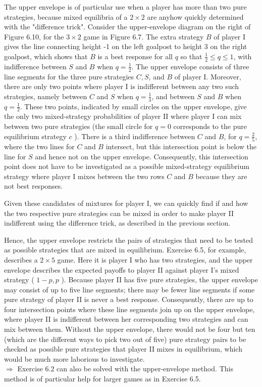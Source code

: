 \documentclass[12pt]{article}
\begin{document}
The upper envelope is of particular use when a player has more than two pure strategies, because mixed equilibria of a $2 \times 2$ are anyhow quickly determined with the "difference trick". Consider the upper-envelope diagram on the right of Figure 6.10, for the $3 \times 2$ game in Figure 6.7. The extra strategy $B$ of player I gives the line connecting height -1 on the left goalpost to height 3 on the right goalpost, which shows that $B$ is a best response for all $q$ so that $\frac{1}{2} \leq q \leq 1$, with indifference between $S$ and $B$ when $q=\frac{1}{2}$. The upper envelope consists of three line segments for the three pure strategies $C, S$, and $B$ of player I. Moreover, there are only two points where player I is indifferent between any two such strategies, namely between $C$ and $S$ when $q=\frac{1}{3}$, and between $S$ and $B$ when $q=\frac{1}{2}$. These two points, indicated by small circles on the upper envelope, give the only two mixed-strategy probabilities of player II where player I can mix between two pure strategies (the small circle for $q=0$ corresponds to the pure equilibrium strategy $c$ ). There is a third indifference between $C$ and $B$, for $q=\frac{2}{5}$, where the two lines for $C$ and $B$ intersect, but this intersection point is below the line for $S$ and hence not on the upper envelope. Consequently, this intersection point does not have to be investigated as a possible mixed-strategy equilibrium strategy where player I mixes between the two rows $C$ and $B$ because they are not best responses.

Given these candidates of mixtures for player I, we can quickly find if and how the two respective pure strategies can be mixed in order to make player II indifferent using the difference trick, as described in the previous section.

Hence, the upper envelope restricts the pairs of strategies that need to be tested as possible strategies that are mixed in equilibrium. Exercise 6.5, for example, describes a $2 \times 5$ game. Here it is player I who has two strategies, and the upper envelope describes the expected payoffs to player II against player I's mixed strategy ( $1-p, p$ ). Because player II has five pure strategies, the upper envelope may consist of up to five line segments; there may be fewer line segments if some pure strategy of player II is never a best response. Consequently, there are up to four intersection points where these line segments join up on the upper envelope, where player II is indifferent between her corresponding two strategies and can mix between them. Without the upper envelope, there would not be four but ten (which are the different ways to pick two out of five) pure strategy pairs to be checked as possible pure strategies that player II mixes in equilibrium, which would be much more laborious to investigate.\\
$\Rightarrow$ Exercise 6.2 can also be solved with the upper-envelope method. This method is of particular help for larger games as in Exercise 6.5.
\end{document}
